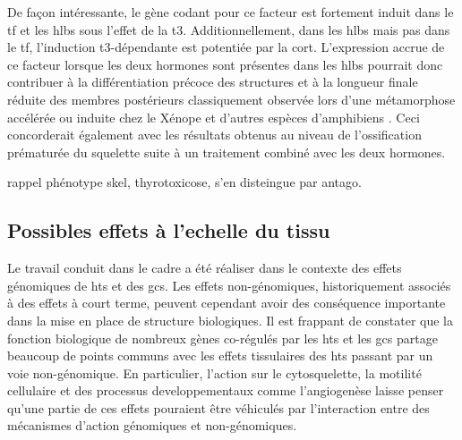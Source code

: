 \documentclass[../main.tex]{subfiles}
\begin{document}
De façon intéressante, le gène codant pour ce facteur est fortement induit dans le \gls{tf} et les \glspl{hlb} sous l'effet de la \gls{t3}.
Additionnellement, dans les \glspl{hlb} mais pas dans le \gls{tf}, l'induction \gls{t3}-dépendante est potentiée par la \gls{cort}.
L'expression accrue de ce facteur lorsque les deux hormones sont présentes dans les \glspl{hlb} pourrait donc contribuer à la différentiation précoce des structures et à la longueur finale réduite des membres postérieurs classiquement observée lors d'une métamorphose accélérée ou induite chez le Xénope et d'autres espèces d'amphibiens \citep{Gomez-Mestre2013a}.
Ceci concorderait également avec les résultats obtenus au niveau de l'ossification prématurée du squelette suite à un traitement combiné avec les deux hormones.

rappel phénotype skel, thyrotoxicose, s'en disteingue par antago.

\subsection{Possibles effets à l'echelle du tissu}
Le travail conduit dans le cadre a été réaliser dans le contexte des effets génomiques de \glspl{ht} et des \glspl{gc}.
Les effets non-génomiques, historiquement associés à des effets à court terme, peuvent cependant avoir des conséquence importante dans la mise en place de structure biologiques.
Il est frappant de constater que la fonction biologique de nombreux gènes co-régulés par les \glspl{ht} et les \glspl{gc} partage beaucoup de points communs avec les effets tissulaires des \glspl{ht} passant par un voie non-génomique.
En particulier, l'action sur le cytosquelette, la motilité cellulaire et des processus developpementaux comme l'angiogenèse laisse penser qu'une partie de ces effets pouraient être véhiculés par l'interaction entre des mécanismes d'action génomiques et non-génomiques.
\end{document}
